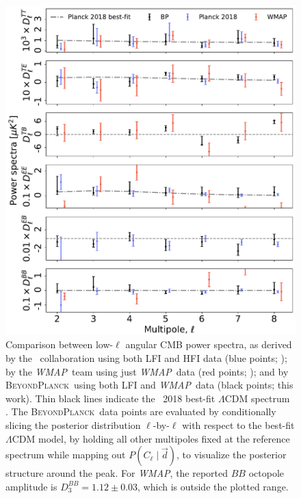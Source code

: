 \documentclass[twocolumn]{aa}
\def\WMAP{\textit{WMAP}}
\renewcommand{\d}[0]{\vec{d}}
\newcommand{\BP}{\textsc{BeyondPlanck}}
\begin{document}
\begin{figure}[t]
  \center
  \includegraphics[width=0.93\linewidth]{figs/Cls_lowl_BI200_R18.pdf}
  \caption{Comparison between low-$\ell$ angular CMB power spectra, as
    derived by the \Planck\ collaboration using both LFI and HFI data
    (blue points; \citealp{planck2016-l05}); by the \WMAP\ team using
    just \WMAP\ data (red points; \citealp{hinshaw2012}); and by
    \BP\ using both LFI and \WMAP\ data (black points;
    this work). Thin black lines indicate the \Planck\ 2018
    best-fit $\Lambda$CDM spectrum \citep{planck2016-l06}. The
    \BP\ data points are evaluated by conditionally slicing the
    posterior distribution $\ell$-by-$\ell$ with respect to the
    best-fit $\Lambda$CDM model, by holding all other multipoles fixed
    at the reference spectrum while mapping out $P(C_{\ell}\mid\d)$,
    to visualize the posterior structure around the peak. For \WMAP,
    the reported $BB$ octopole amplitude is $D_{3}^{BB}=1.12\pm0.03$,
    which is outside the plotted range.}
   \label{fig:powspec_lowl}
\end{figure}
\end{document}
